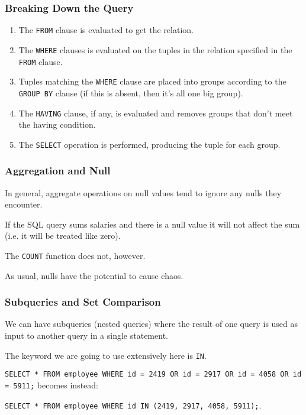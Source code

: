 \begin{frame}
\frametitle{Breaking Down the Query}

\begin{enumerate}
	\item The \texttt{FROM} clause is evaluated to get the relation.
	\item The \texttt{WHERE} clauses is evaluated on the tuples in the relation specified in the \texttt{FROM} clause.
	\item Tuples matching the \texttt{WHERE} clause are placed into groups according to the \texttt{GROUP BY} clause (if this is absent, then it's all one big group).
	\item The \texttt{HAVING} clause, if any, is evaluated and removes groups that don't meet the having condition.
	\item The \texttt{SELECT} operation is performed, producing the tuple for each group.
\end{enumerate}

\end{frame}



\begin{frame}
\frametitle{Aggregation and Null}


In general, aggregate operations on null values tend to ignore any nulls they encounter.

If the SQL query sums salaries and there is a null value it will not affect the sum (i.e. it will be treated like zero). 

The \texttt{COUNT} function does not, however. 

As usual, nulls have the potential to cause chaos.

\end{frame}



\begin{frame}
\frametitle{Subqueries and Set Comparison}

We can have subqueries (nested queries) where the result of one query is used as input to another query in a single statement. 

The keyword we are going to use extensively here is \texttt{IN}.  

\texttt{SELECT * FROM employee WHERE id = 2419 OR id = 2917 OR id = 4058 OR id = 5911;} becomes instead:


\texttt{SELECT * FROM employee WHERE id IN (2419, 2917, 4058, 5911);}.

\end{frame}



